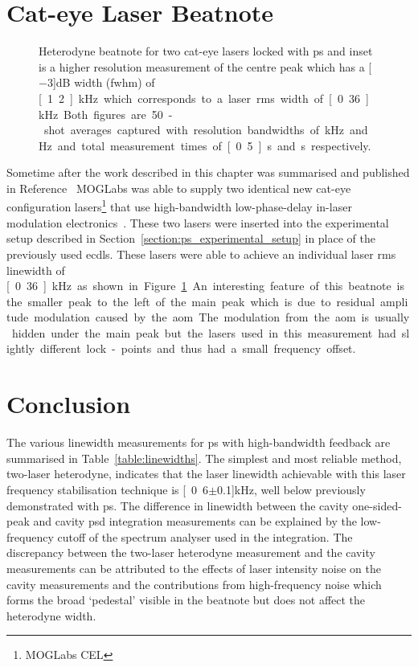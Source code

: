 \section{Cat-eye Laser Beatnote}

\begin{figure}
\center

\caption[Heterodyne beatnote for two cat-eye lasers locked with high-bandwidth polarisation spectroscopy.]{Heterodyne beatnote for two cat-eye lasers locked with \gls{ps} and inset is a higher resolution measurement of the centre peak which has a \unit[$-3$]{dB} width (\gls{fwhm}) of \unit[1.2]{kHz} which corresponds to a laser \gls{rms} width of \unit[0.36]{kHz}.
Both figures are 50-shot averages captured with resolution bandwidths of \unit[30]{kHz} and \unit[100]{Hz} and total measurement times of \unit[0.5]{s} and \unit[2]{s} respectively.}
\label{figure:cateye_beatnote}
\end{figure}

Sometime after the work described in this chapter was summarised and published in Reference~\cite{torrance_sub-kilohertz_2016} MOGLabs was able to supply two identical new cat-eye configuration lasers\footnote{MOGLabs CEL} that use high-bandwidth low-phase-delay in-laser modulation electronics~\cite{thompson_narrow_2012}.
These two lasers were inserted into the experimental setup described in Section~\ref{section:ps_experimental_setup} in place of the previously used \glspl{ecdl}.
These lasers were able to achieve an individual laser \gls{rms} linewidth of \unit[0.36]{kHz} as shown in Figure~\ref{figure:cateye_beatnote}.
An interesting feature of this beatnote is the smaller peak to the left of the main peak which is due to residual amplitude modulation caused by the \gls{aom}.
The modulation from the \gls{aom} is usually hidden under the main peak but the lasers used in this measurement had slightly different lock-points and thus had a small frequency offset.


\section{Conclusion}

The various linewidth measurements for \gls{ps} with high-bandwidth feedback are summarised in Table~\ref{table:linewidths}.
The simplest and most reliable method, two-laser heterodyne, indicates that the laser linewidth achievable with this laser frequency stabilisation technique is \unit[0.6$\pm$0.1]{kHz}, well below previously demonstrated with \gls{ps}.
The difference in linewidth between the cavity one-sided-peak and cavity \gls{psd} integration measurements can be explained by the low-frequency cutoff of the spectrum analyser used in the integration.
The discrepancy between the two-laser heterodyne measurement and the cavity measurements can be attributed to the effects of laser intensity noise on the cavity measurements and the contributions from high-frequency noise which forms the broad `pedestal' visible in the beatnote but does not affect the heterodyne width.

